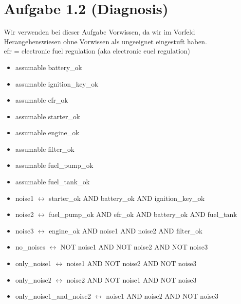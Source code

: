 \documentclass[a4paper,10pt]{article}
\begin{document}
\section*{Aufgabe 1.2 (Diagnosis)}
Wir verwenden bei dieser Aufgabe Vorwissen, da wir im Vorfeld Herangehenswiesen ohne Vorwissen als ungeeignet eingestuft haben. \\
efr = electronic fuel regulation (aka electronic euel regulation)
\begin{itemize}
  \item assumable battery\_ok
  \item assumable ignition\_key\_ok
  \item assumable efr\_ok
  \item assumable starter\_ok
  \item assumable engine\_ok
  \item assumable filter\_ok
  \item assumable fuel\_pump\_ok
  \item assumable fuel\_tank\_ok
  \item noise1 $\leftrightarrow$ starter\_ok AND battery\_ok AND ignition\_key\_ok
  \item noise2 $\leftrightarrow$ fuel\_pump\_ok AND efr\_ok AND battery\_ok AND fuel\_tank
  \item noise3 $\leftrightarrow$ engine\_ok AND noise1 AND noise2 AND filter\_ok
  \item no\_noises $\leftrightarrow$ NOT noise1 AND NOT noise2 AND NOT noise3
  \item only\_noise1 $\leftrightarrow$ noise1 AND NOT noise2 AND NOT noise3
  \item only\_noise2 $\leftrightarrow$ noise2 AND NOT noise1 AND NOT noise3
  \item only\_noise1\_and\_noise2 $\leftrightarrow$ noise1 AND noise2 AND NOT noise3
\end{itemize}
\end{document}
